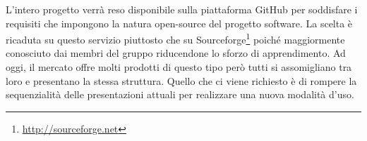 L’intero progetto verrà reso disponibile sulla piattaforma \gls{GitHub} per soddisfare i requisiti che impongono la natura open-source del progetto software.
La scelta è ricaduta su questo servizio piuttosto che su \gls{Sourceforge}\footnote{\url{http://sourceforge.net}} poiché maggiormente conosciuto dai membri del gruppo riducendone lo sforzo di apprendimento.
Ad oggi, il mercato offre molti prodotti di questo tipo però tutti si assomigliano tra loro e presentano la stessa struttura. Quello che ci viene richiesto è di rompere la sequenzialità delle presentazioni attuali per realizzare una nuova modalità d’uso.

